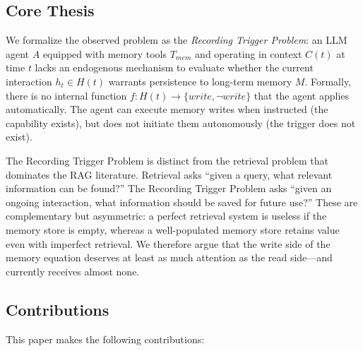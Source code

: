 \documentclass[11pt]{article}
\begin{document}
\subsection{Core Thesis}

We formalize the observed problem as the \emph{Recording Trigger Problem}: an LLM agent $A$ equipped with memory tools $T_{mem}$ and operating in context $C(t)$ at time $t$ lacks an endogenous mechanism to evaluate whether the current interaction $h_t \in H(t)$ warrants persistence to long-term memory $M$. Formally, there is no internal function $f: H(t) \rightarrow \{write, \neg write\}$ that the agent applies automatically. The agent can execute memory writes when instructed (the capability exists), but does not initiate them autonomously (the trigger does not exist).

The Recording Trigger Problem is distinct from the retrieval problem that dominates the RAG literature. Retrieval asks ``given a query, what relevant information can be found?'' The Recording Trigger Problem asks ``given an ongoing interaction, what information should be saved for future use?'' These are complementary but asymmetric: a perfect retrieval system is useless if the memory store is empty, whereas a well-populated memory store retains value even with imperfect retrieval. We therefore argue that the write side of the memory equation deserves at least as much attention as the read side---and currently receives almost none.

\subsection{Contributions}

This paper makes the following contributions:
\end{document}
